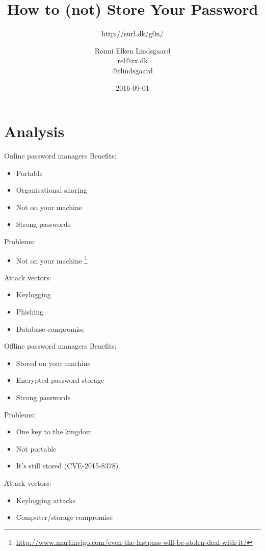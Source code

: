 \documentclass{beamer}
\title{How to (not) Store Your Password}
\subtitle{\url{http://surl.dk/g0n/}}
\author{Ronni Elken Lindsgaard \\ rel@zx.dk \\ @rlindsgaard}
\date{2016-09-01}
\begin{document}
\begin{frame}
  \maketitle
\end{frame}

\begin{frame}
  \tableofcontents
\end{frame}

\section{Analysis}
\begin{frame}{Online password managers}
  Benefits:
  \begin{itemize}
    \item Portable
    \item Organisational sharing
    \item Not on your machine
    \item Strong passwords
  \end{itemize}
  Problems:
  \begin{itemize}
    \item Not on your machine \footnote{\url{http://www.martinvigo.com/even-the-lastpass-will-be-stolen-deal-with-it/}}
  \end{itemize}
  Attack vectors:
  \begin{itemize}
    \item Keylogging
    \item Phishing
    \item Database compromise
  \end{itemize}
\end{frame}

\begin{frame}{Offline password managers}
  Benefits:
  \begin{itemize}
    \item Stored on your machine
    \item Encrypted password storage
    \item Strong passwords
  \end{itemize}
  Problems:
  \begin{itemize}
    \item One key to the kingdom
    \item Not portable
    \item It's still stored (CVE-2015-8378)
  \end{itemize}
  Attack vectors:
  \begin{itemize}
    \item Keylogging attacks
    \item Computer/storage compromise
  \end{itemize}
\end{frame}
\end{document}
